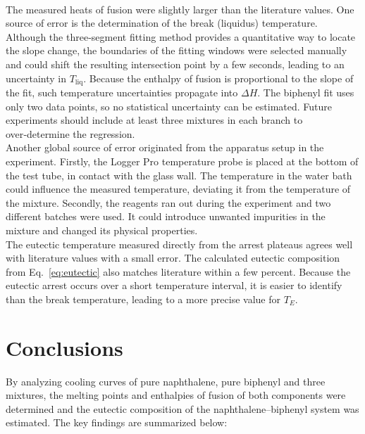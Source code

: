 \documentclass[12pt]{article}
\begin{document}
\\
The measured heats of fusion were slightly larger than the literature values\cite{gallus2001binary}.  One source of error is the determination of the break (liquidus) temperature.  Although the three‑segment fitting method provides a quantitative way to locate the slope change, the boundaries of the fitting windows were selected manually and could shift the resulting intersection point by a few seconds, leading to an uncertainty in $T_{\mathrm{liq}}$.  Because the enthalpy of fusion is proportional to the slope of the fit, such temperature uncertainties propagate into $\Delta H$.  The biphenyl fit uses only two data points, so no statistical uncertainty can be estimated.  Future experiments should include at least three mixtures in each branch to over‑determine the regression.
\\
Another global source of error originated from the apparatus setup in the experiment. Firstly, the Logger Pro temperature probe is placed at the bottom of the test tube, in contact with the glass wall. The temperature in the water bath could influence the measured temperature, deviating it from the temperature of the mixture. Secondly, the reagents ran out during the experiment and two different batches were used. It could introduce unwanted impurities in the mixture and changed its physical properties.
\\
The eutectic temperature measured directly from the arrest plateaus agrees well with literature values with a small error.  The calculated eutectic composition from Eq.~\ref{eq:eutectic} also matches literature within a few percent.  Because the eutectic arrest occurs over a short temperature interval, it is easier to identify than the break temperature, leading to a more precise value for $T_E$.

\section*{Conclusions}

By analyzing cooling curves of pure naphthalene, pure biphenyl and three mixtures, the melting points and enthalpies of fusion of both components were determined and the eutectic composition of the naphthalene–biphenyl system was estimated.  The key findings are summarized below:
\end{document}
